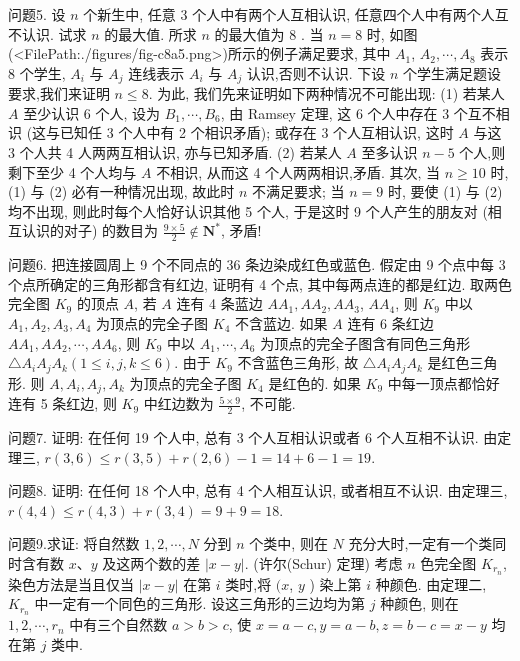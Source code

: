 问题5. 设 $n$ 个新生中, 任意 3 个人中有两个人互相认识, 任意四个人中有两个人互不认识.
试求 $n$ 的最大值.
所求 $n$ 的最大值为 8 .
当 $n=8$ 时, 如图(<FilePath:./figures/fig-c8a5.png>)所示的例子满足要求, 其中 $A_1$, $A_2, \cdots, A_8$ 表示 8 个学生, $A_i$ 与 $A_j$ 连线表示 $A_i$ 与 $A_j$ 认识,否则不认识.
下设 $n$ 个学生满足题设要求,我们来证明 $n \leqslant 8$. 为此, 我们先来证明如下两种情况不可能出现:
(1) 若某人 $A$ 至少认识 6 个人, 设为 $B_1, \cdots, B_6$, 由
Ramsey 定理, 这 6 个人中存在 3 个互不相识 (这与已知任 3 个人中有 2 个相识矛盾); 或存在 3 个人互相认识, 这时 $A$ 与这 3 个人共 4 人两两互相认识, 亦与已知矛盾.
(2) 若某人 $A$ 至多认识 $n-5$ 个人,则剩下至少 4 个人均与 $A$ 不相识, 从而这 4 个人两两相识,矛盾.
其次, 当 $n \geqslant 10$ 时,(1) 与 (2) 必有一种情况出现, 故此时 $n$ 不满足要求; 当 $n=9$ 时, 要使 (1) 与 (2) 均不出现, 则此时每个人恰好认识其他 5 个人, 于是这时 9 个人产生的朋友对 (相互认识的对子) 的数目为 $\frac{9 \times 5}{2} \notin \mathbf{N}^*$, 矛盾!



问题6. 把连接圆周上 9 个不同点的 36 条边染成红色或蓝色.
假定由 9 个点中每 3 个点所确定的三角形都含有红边, 证明有 4 个点, 其中每两点连的都是红边.
取两色完全图 $K_9$ 的顶点 $A$, 若 $A$ 连有 4 条蓝边 $A A_1, A A_2, A A_3$, $A A_4$, 则 $K_9$ 中以 $A_1, A_2, A_3, A_4$ 为顶点的完全子图 $K_4$ 不含蓝边.
如果 $A$ 连有 6 条红边 $A A_1, A A_2, \cdots, A A_6$, 则 $K_9$ 中以 $A_1, \cdots, A_6$ 为顶点的完全子图含有同色三角形 $\triangle A_i A_j A_k(1 \leqslant i, j, k \leqslant 6)$. 由于 $K_9$ 不含蓝色三角形, 故 $\triangle A_i A_j A_k$ 是红色三角形.
则 $A, A_i, A_j, A_k$ 为顶点的完全子图 $K_4$ 是红色的.
如果 $K_9$ 中每一顶点都恰好连有 5 条红边, 则 $K_9$ 中红边数为 $\frac{5 \times 9}{2}$, 不可能.



问题7. 证明: 在任何 19 个人中, 总有 3 个人互相认识或者 6 个人互相不认识.
由定理三, $r(3,6) \leqslant r(3,5)+r(2,6)-1=14+6-1=19$.



问题8. 证明: 在任何 18 个人中, 总有 4 个人相互认识, 或者相互不认识.
由定理三, $r(4,4) \leqslant r(4,3)+r(3,4)=9+9=18$.



问题9.求证: 将自然数 $1,2, \cdots, N$ 分到 $n$ 个类中, 则在 $N$ 充分大时,一定有一个类同时含有数 $x 、 y$ 及这两个数的差 $|x-y|$. (许尔(Schur) 定理)
考虑 $n$ 色完全图 $K_{r_n}$, 染色方法是当且仅当 $|x-y|$ 在第 $i$ 类时,将 $(x$, $y$ ) 染上第 $i$ 种颜色.
由定理二, $K_{r_n}$ 中一定有一个同色的三角形.
设这三角形的三边均为第 $j$ 种颜色, 则在 $1,2, \cdots, r_n$ 中有三个自然数 $a>b>c$, 使 $x= a-c, y=a-b, z=b-c=x-y$ 均在第 $j$ 类中.



